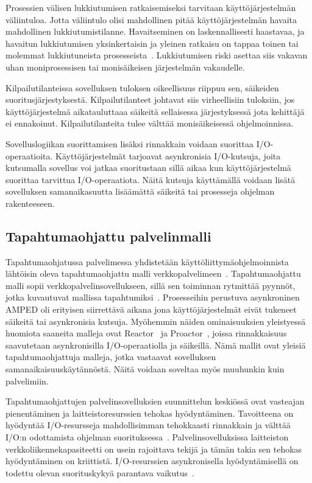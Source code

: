 \documentclass[finnish]{tktltiki2}
\theoremstyle{definition}
\theoremstyle{remark}
\begin{document}
Prosessien välisen lukkiutumisen ratkaisemiseksi tarvitaan
käyttöjärjestelmän väliintuloa. Jotta väliintulo olisi mahdollinen pitää
käyttöjärjestelmän havaita mahdollinen lukkiutumistilanne.
Havaitseminen on laskennallisesti haastavaa, ja havaitun lukkiutumisen
yksinkertaisin ja yleinen ratkaisu on tappaa toinen
tai molemmat lukkiutuneista prosesseista~\cite{stallings_operating_2018}.
Lukkiutumisen riski asettaa siis vakavan uhan moniprosessisen tai monisäikeisen
järjestelmän vakaudelle.

Kilpailutilanteissa sovelluksen tuloksen oikeellisuus riippuu sen,
säikeiden suoritusjärjestyksestä. Kilpailutilanteet johtavat siis
virheellisiin tuloksiin, jos käyttöjärjestelmä aikatauluttaaa
säikeitä sellaisessa järjestyksessä jota kehittäjä ei ennakoinut.
Kilpailutilanteita tulee välttää monisäikeisessä ohjelmoinnissa.

Sovelluslogiikan suorittamisen lisäksi rinnakkain voidaan suorittaa I/O-operaatioita.
Käyttöjärjestelmät tarjoavat asynkronisia I/O-kutsuja, joita kutsumalla
sovellus voi jatkaa suoritustaan sillä aikaa kun käyttöjärjestelmä
suorittaa tarvittua I/O-operaatiota. Näitä kutsuja käyttämällä voidaan
lisätä sovelluksen samanaikasuutta lisäämättä säikeitä
tai prosesseja ohjelman rakenteeseen.

\subsection{Tapahtumaohjattu palvelinmalli}

Tapahtumaohjatussa palvelimessa yhdistetään
käyttöliittymäohjelmoinnista lähtöisin oleva tapahtumaohjattu malli
verkkopalvelimeen~\cite{pai_flash:_1999}. Tapahtumaohjattu malli sopii verkkopalvelinsovellukseen,
sillä sen toiminnan rytmittää pyynnöt, jotka
kuvautuvat mallissa tapahtumiksi~\cite{schmidt_reactor:_1995}.
Prosesseihin perustuva asynkroninen AMPED\cite{pai_flash:_1999}
oli erityisen siirrettävä aikana jona käyttöjärjestelmät
eivät tukeneet säikeitä tai asynkronisia kutsuja.
Myöhemmin näiden ominaisuuksien yleistyessä
huomiota saaneita malleja ovat Reactor~\cite{schmidt_reactor:_1995}
ja Proactor~\cite{pyarali_proactor_1997}, joissa
rinnakkaisuus saavutetaan asynkronisilla I/O-operaatiolla
ja säikeillä. Nämä mallit ovat yleisiä tapahtumaohjattuja malleja, jotka
vastaavat sovelluksen samanaikaisuuskäytännöstä.
Näitä voidaan soveltaa myös muuhunkin kuin palvelimiin.


Tapahtumaohjattujen palvelinsovelluksien suunnittelun keskiössä
ovat vasteajan pienentäminen ja laitteistoresurssien tehokas hyödyntäminen.
Tavoitteena on hyödyntää I/O-resursseja mahdollisimman tehokkaasti
rinnakkain ja välttää I/O:n odottamista ohjelman suorituksessa~\cite{pai_flash:_1999}.
Palvelinsovelluksissa
laitteiston verkkoliikennekapasiteetti on usein rajoittava tekijä ja tämän takia
sen tehokas hyödyntäminen on kriittistä. I/O-resurssien asynkronisella hyödyntämisellä on todettu
olevan suorituskykyä parantava vaikutus~\cite{hu_applying_1998}.
\end{document}
